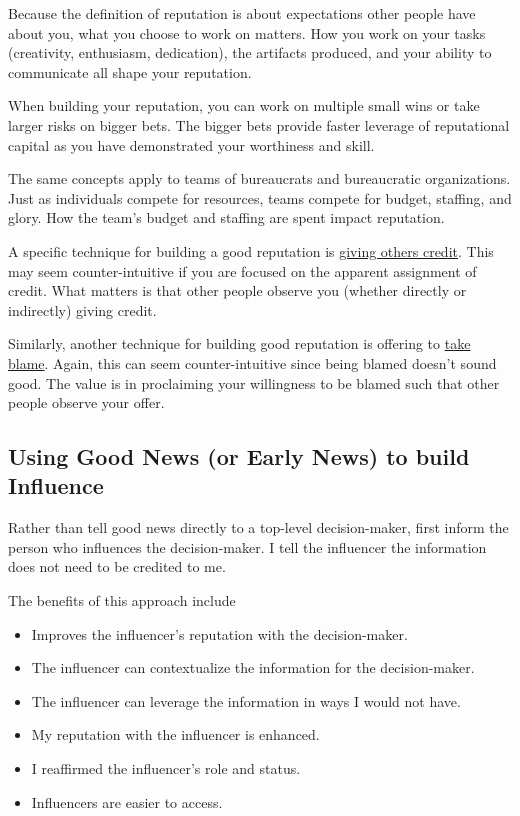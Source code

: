 Because the definition of reputation is about expectations other people have about you, what you choose to work on matters. How you work on your tasks (creativity, enthusiasm, dedication), the artifacts produced, and your ability to communicate all shape your reputation. 

When building your reputation, you can work on multiple small wins or take larger risks on bigger bets. The bigger bets provide faster leverage of reputational capital as you have demonstrated your worthiness and skill. 

The same concepts apply to teams of bureaucrats and bureaucratic organizations. Just as individuals compete for resources, teams compete for budget, staffing, and glory. How the team's budget and staffing are spent impact reputation. 

A specific technique for building a good reputation is 
\hyperref[sec:credit-others]{giving others credit}. 
This may seem counter-intuitive if you are focused on the apparent assignment of credit. What  matters is that other people observe you (whether directly or indirectly) giving credit. 

Similarly, another technique for building good reputation is offering to \hyperref[sec:take-blame]{take blame}.
Again, this can seem counter-intuitive since being blamed doesn't sound good. The value is in proclaiming your willingness to be blamed such that other people observe your offer. 

\subsection*{Using Good News (or Early News) to build Influence}

Rather than tell good news directly to a top-level decision-maker, first inform the person who influences the decision-maker.
I tell the influencer the information does not need to be credited to me.

The benefits of this approach include
\begin{itemize}
    \item Improves the influencer's reputation with the decision-maker.
    \item The influencer can contextualize the information for the decision-maker.
    \item The influencer can leverage the information in ways I would not have.
    \item My reputation with the influencer is enhanced.
    \item I reaffirmed the influencer's role and status.
    \item Influencers are easier to access.
\end{itemize}

